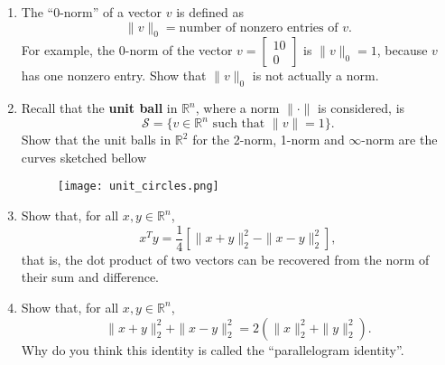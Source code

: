 \documentclass{article}
\begin{document}
\begin{itemize}
\begin{enumerate}
\bigskip


\item 
The ``0-norm'' of a vector $v$ is defined as
\[
\|v\|_0 = \mbox{number of nonzero entries of $v$}.
\]
For example, the 0-norm of the vector $v=\left[ \begin{smallmatrix} 10 \\ 0 \end{smallmatrix}\right]$ is $\|v\|_0 = 1$, because $v$ has one nonzero entry.
Show that $\|v\|_0$ is not actually a norm. 

\bigskip

\item Recall that the \textbf{unit ball} in $\mathbb{R}^n$, where a norm $\|\cdot\|$ is considered, is 
$$
\mathcal{S}=\{ v\in\mathbb{R}^n \mbox{ such that } \|v\|=1\}.
$$
Show that the unit balls in $\mathbb{R}^2$ for the 2-norm, 1-norm and $\infty$-norm are the curves sketched bellow
\begin{figure}[h]
\centering
\texttt{[image: unit\_circles.png]}
\end{figure}

\bigskip

\item Show that, for all $x, y\in \mathbb{R}^n$, 
$$
x^Ty = \frac{1}{4} \left[ \|x+y\|_2^2 -\|x-y\|_2^2\right],
$$
that is,  the dot product of two vectors can be recovered from the norm of their sum and difference. 

\bigskip


\item 
Show that, for all $x, y\in \mathbb{R}^n$,
\[
\|x+y\|_2^2 + \|x-y\|_2^2 = 2\left(\|x\|_2^2 + \|y\|_2^2\right).
\]
Why do you think this identity is called the ``parallelogram identity''.


\end{enumerate}
\end{itemize}
\end{document}
